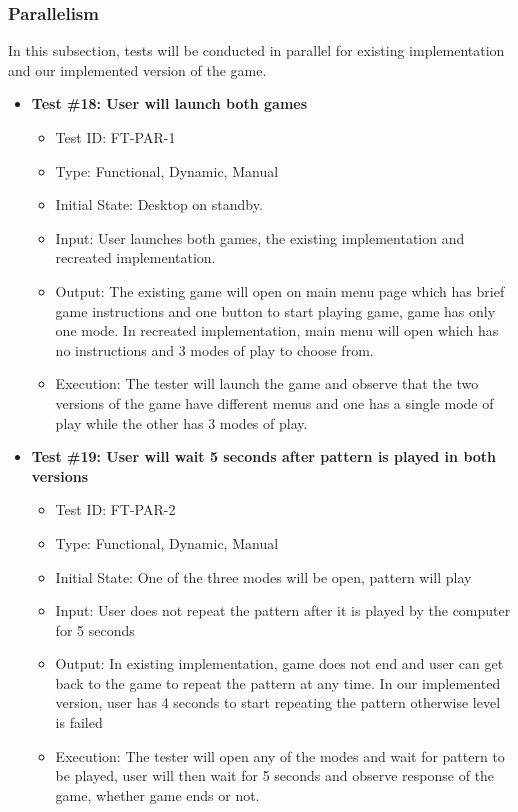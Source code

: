\documentclass[12pt, titlepage]{article}
\begin{document}
\subsubsection{Parallelism}
In this subsection, tests will be conducted in parallel for existing implementation and our implemented version of the game.
\begin{itemize}

\item \textbf{Test \#18: User will launch both games }
\begin{itemize}
\item Test ID: FT-PAR-1
\item Type: Functional, Dynamic, Manual 		
\item Initial State: Desktop on standby.					
\item Input: User launches both games, the existing implementation and recreated implementation. 	
\item Output: The existing game will open on main menu page which has brief game instructions and one button to start playing game, game has only one mode. In recreated implementation, main menu will open which has no instructions and 3 modes of play to choose from.
\item Execution: The tester will launch the game and observe that the two versions of the game have different menus and one has a single mode of play while the other has 3 modes of play.
\end{itemize}


\item \textbf{Test \#19: User will wait 5 seconds after pattern is played in both versions }
\begin{itemize}
\item Test ID: FT-PAR-2
\item Type: Functional, Dynamic, Manual 		
\item Initial State: One of the three modes will be open, pattern will play					
\item Input: User does not repeat the pattern after it is played by the computer for 5 seconds	
\item Output: In existing implementation, game does not end and user can get back to the game to repeat the pattern at any time. In our implemented version, user has 4 seconds to start repeating the pattern otherwise level is failed				
\item Execution: The tester will open any of the modes and wait for pattern to be played, user will then wait for 5 seconds and observe response of the game, whether game ends or not.
\end{itemize}


\end{itemize}
\end{document}

